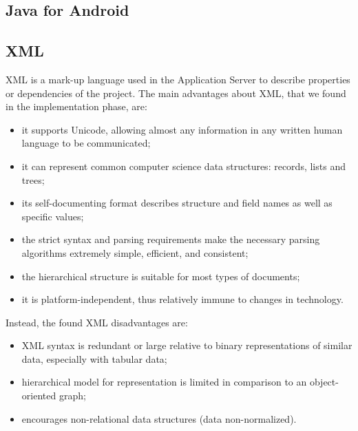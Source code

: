 \subsection{Java for Android}
\label{subsect:Java for Android}
\subsection{XML}
\label{subsect:XML}
XML is a mark-up language used in the Application Server to describe properties or dependencies of the project. The main advantages about XML, that we found in the implementation phase, are:
\begin{itemize}
\item it supports Unicode, allowing almost any information in any written human language to be communicated;
\item it can represent common computer science data structures: records, lists and trees;
\item its self-documenting format describes structure and field names as well as specific values;
\item the strict syntax and parsing requirements make the necessary parsing algorithms extremely simple, efficient, and consistent;
\item the hierarchical structure is suitable for most types of documents;
\item it is platform-independent, thus relatively immune to changes in technology.
\end{itemize}
Instead, the found XML disadvantages are:
\begin{itemize}
\item XML syntax is redundant or large relative to binary representations of similar data, especially with tabular data;
\item hierarchical model for representation is limited in comparison to an object-oriented graph;
\item encourages non-relational data structures (data non-normalized).
\end{itemize}


